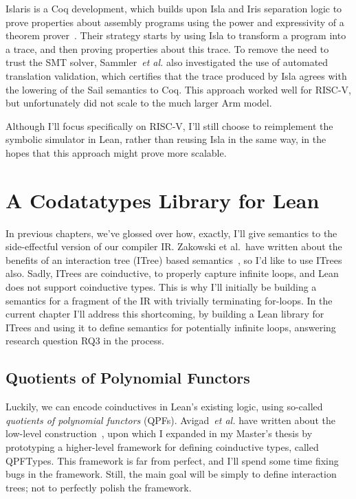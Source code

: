 \documentclass[a4paper]{scrartcl}
\newcommand*{\etal}{~\emph{et al.}}
\begin{document}
Islaris is a Coq development, which builds upon Isla and Iris separation logic to 
prove properties about assembly programs using the power and expressivity of a 
theorem prover~\cite{sammlerIslarisVerificationMachine2022}. Their strategy starts by using Isla to transform a program into a trace, and then proving properties about this trace.
To remove the need to trust the SMT solver, Sammler\etal{} also investigated
the use of automated translation validation, which certifies that the trace produced
by Isla agrees with the lowering of the Sail semantics to Coq. This approach 
worked well for RISC-V, but unfortunately did not scale to the much larger Arm model.

Although I'll focus specifically on RISC-V, I'll still choose to reimplement 
the symbolic simulator in Lean, rather than reusing Isla in the same way, 
in the hopes that this approach might prove more scalable.


\section{A Codatatypes Library for
Lean}\label{a-codatatypes-library-for-lean}

In previous chapters, we've glossed over how, exactly, I'll give
semantics to the side-effectful version of our compiler IR. Zakowski et
al.~have written about the benefits of an interaction tree (ITree)
based semantics~\cite{zakowskiModularCompositionalExecutable2021, xiaInteractionTreesRepresenting2020}, so I'd like to use
ITrees also. Sadly, ITrees are coinductive, to properly capture infinite loops, 
and Lean does not support coinductive types.
This is why I'll initially be building a semantics for a fragment of the IR with
trivially terminating for-loops. 
In the current chapter I'll address this shortcoming, by building a Lean library for ITrees and using it to define semantics for potentially infinite loops,
answering research question \textsc{RQ3} in the process.

\subsection{Quotients of Polynomial
Functors}\label{quotients-of-polynomial-functors}

Luckily, we can encode coinductives in Lean's existing logic, using
so-called \emph{quotients of polynomial functors} (QPFs). Avigad\etal{} have written about the low-level construction~\cite{avigadDataTypesQuotients2019}, 
upon which I expanded in my Master's thesis by prototyping a higher-level framework for defining
coinductive types, called QPFTypes. This framework is far from perfect,
and I'll spend some time fixing bugs in the framework. Still, the main
goal will be simply to define interaction trees; not to perfectly polish
the framework.
\end{document}
